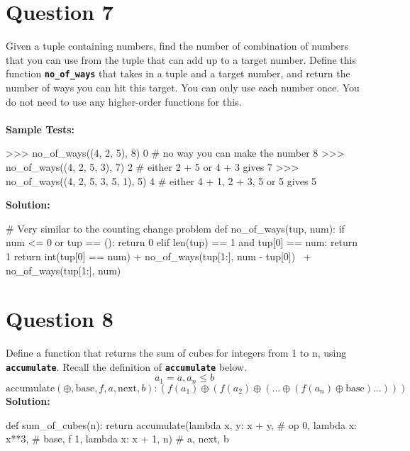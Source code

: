 \section{Question 7}
Given a tuple containing numbers, find the number of combination of numbers that
you can use from the tuple that can add up to a target number. Define this function
\texttt{\bfseries no\_of\_ways} that takes in a tuple and a target number, and return the number of ways
you can hit this target. You can only use each number once. You do not need to use
any higher-order functions for this. \\ \\
\textbf{Sample Tests:}
\begin{python}
>>> no_of_ways((4, 2, 5), 8)
0                               # no way you can make the number 8
>>> no_of_ways((4, 2, 5, 3), 7)
2                               # either 2 + 5 or 4 + 3 gives 7
>>> no_of_ways((4, 2, 5, 3, 5, 1), 5)
4                               # either 4 + 1, 2 + 3, 5 or 5 gives 5
\end{python}
\textbf{Solution:}
\begin{python}
# Very similar to the counting change problem
def no_of_ways(tup, num):
    if num <= 0 or tup == ():
        return 0
    elif len(tup) == 1 and tup[0] == num:
        return 1
    return int(tup[0] == num) + no_of_ways(tup[1:], num - tup[0]) \
           + no_of_ways(tup[1:], num)
\end{python}

\section{Question 8}
Define a function that returns the sum of cubes for integers from 1 to n, using \texttt{\bfseries accumulate}.
Recall the definition of \texttt{\bfseries accumulate} below.
\[a_1 = a, a_n \le b\]
\[\text{accumulate}(\oplus, \text{base}, f, a, \text{next}, b): (f(a_1) \oplus (f(a_2) \oplus (... \oplus (f(a_n) \oplus \text{base})...)))\]
\textbf{Solution:}
\begin{python}
def sum_of_cubes(n):
    return accumulate(lambda x, y: x + y,       # op
                      0, lambda x: x**3,        # base, f
                      1, lambda x: x + 1, n)    # a, next, b
\end{python}

\newpage
